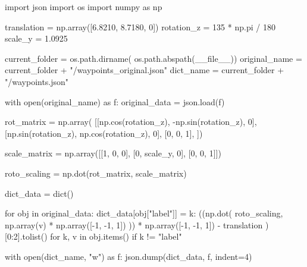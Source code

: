import json
import os
import numpy as np

translation = np.array([6.8210, 8.7180, 0])
rotation_z = 135 * np.pi / 180
scale_y = 1.0925

current_folder = os.path.dirname(
                os.path.abspath(__file__))
original_name = current_folder
                + "/waypoints_original.json"
dict_name = current_folder + "/waypoints.json"

with open(original_name) as f:
    original_data = json.load(f)

rot_matrix = np.array(
    [[np.cos(rotation_z), -np.sin(rotation_z), 0],
    [np.sin(rotation_z), np.cos(rotation_z), 0],
    [0, 0, 1],
])

scale_matrix = np.array([[1, 0, 0],
                            [0, scale_y, 0],
                            [0, 0, 1]])

roto_scaling = np.dot(rot_matrix, scale_matrix)

dict_data = dict()

for obj in original_data:
    dict_data[obj["label"]] = {
        k:
            ((np.dot(
                    roto_scaling,
                    np.array(v) * np.array([-1, -1, 1])
                )) * np.array([-1, -1, 1])
                - translation
            )[0:2].tolist()
        for k, v in obj.items() if k != "label"
    }

with open(dict_name, "w") as f:
    json.dump(dict_data, f, indent=4)
